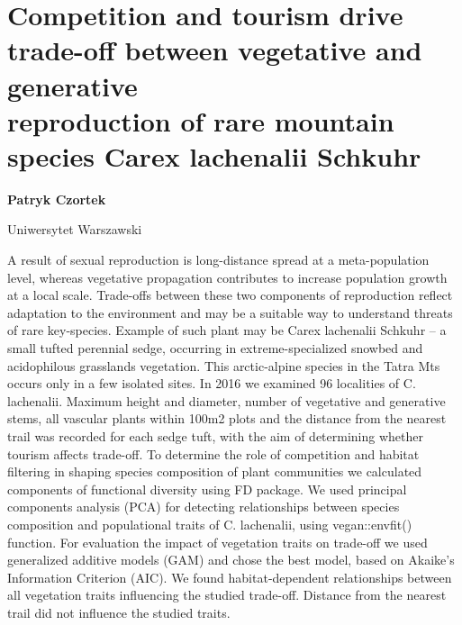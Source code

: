 \documentclass[\main/boa.tex]{subfiles}
\begin{document}
\section[Competition and tourism drive trade-off between vegetative and generative \\ reproduction of rare mountain species Carex lachenalii Schkuhr]{Competition and tourism drive trade-off between vegetative and generative \\ reproduction of rare mountain species Carex lachenalii Schkuhr}

\begin{minipage}{0.915\textwidth}
	\centering
  {\bf {} Patryk Czortek}
\end{minipage}


\begin{affiliations}
\begin{minipage}{0.915\textwidth}
\centering
Uniwersytet Warszawski  \\[-2pt]
\end{minipage}
\end{affiliations}

\vskip 0.3cm

 A result of sexual reproduction is long-distance spread at a meta-population level, whereas vegetative propagation contributes to increase population growth at a local scale. Trade-offs between these two components of reproduction reflect adaptation to the environment and may be a suitable way to understand threats of rare key-species. Example of such plant may be Carex lachenalii Schkuhr – a small tufted perennial sedge, occurring in extreme-specialized snowbed and acidophilous grasslands vegetation. This arctic-alpine species in the Tatra Mts occurs only in a few isolated sites. In 2016 we examined 96 localities of C. lachenalii. Maximum height and diameter, number of vegetative and generative stems, all vascular plants within 100m2 plots and the distance from the nearest trail was recorded for each sedge tuft, with the aim of determining whether tourism affects trade-off. To determine the role of competition and habitat filtering in shaping species composition of plant communities we calculated components of functional diversity using FD package. We used principal components analysis (PCA) for detecting relationships between species composition and populational traits of C. lachenalii, using vegan::envfit() function. For evaluation the impact of vegetation traits on trade-off we used generalized additive models (GAM) and chose the best model, based on Akaike’s Information Criterion (AIC). We found habitat-dependent relationships between all vegetation traits influencing the studied trade-off. Distance from the nearest trail did not influence the studied traits. 
\end{document}
